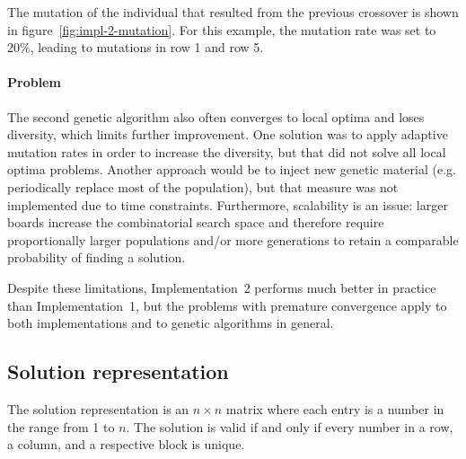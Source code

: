 The mutation of the individual that resulted from the previous crossover is shown in figure~\ref{fig:impl-2-mutation}. For this example, the mutation rate was set to 20\%, leading to mutations in row 1 and row 5. 

\paragraph{Problem}
The second genetic algorithm also often converges to local optima and loses diversity, which limits further improvement. One solution was to apply adaptive mutation rates in order to increase the diversity, but that did not solve all local optima problems. Another approach would be to inject new genetic material (e.g. periodically replace most of the population), but that measure was not implemented due to time constraints. Furthermore, scalability is an issue: larger boards increase the combinatorial search space and therefore require proportionally larger populations and/or more generations to retain a comparable probability of finding a solution. 

Despite these limitations, Implementation~2 performs much better in practice than Implementation~1, but the problems with premature convergence apply to both implementations and to genetic algorithms in general.

\subsection{Solution representation}
The solution representation is an $n \times n$ matrix where each entry is a number in the range from 1 to $n$. The solution is valid if and only if every number in a row, a column, and a respective block is unique.
